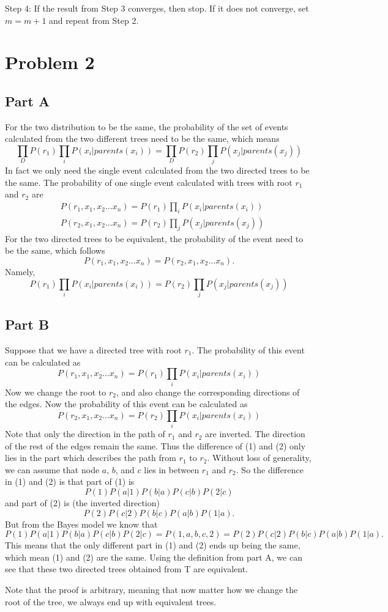 \noindent Step 4: If the result from Step 3 converges, then stop. If it does not converge, set $m=m+1$ and repeat from Step 2.


\section{Problem 2}
\subsection{Part A}
For the two distribution to be the same, the probability of the set of events calculated from the two different trees need to be the same, which means
\[\prod\limits_{D}P(r_1)\prod\limits_{i}P(x_i|parents(x_i))=\prod\limits_{D}P(r_2)\prod\limits_{j}P(x_j|parents(x_j))\]
In fact we only need the single event calculated from the two directed trees to be the same. The probability of one single event calculated with trees with root $r_1$ and $r_2$ are
\begin{align*}
& P(r_1,x_1,x_2\ldots x_n)=P(r_1)\prod\limits_{i}P(x_i|parents(x_i)) \\
& P(r_2,x_1,x_2\ldots x_n)=P(r_2)\prod\limits_{j}P(x_j|parents(x_j))
\end{align*}
For the two directed trees to be equivalent, the probability of the event need to be the same, which follows 
\[P(r_1,x_1,x_2\ldots x_n)=P(r_2,x_1,x_2\ldots x_n).\]
Namely,
\[P(r_1)\prod\limits_{i}P(x_i|parents(x_i))=P(r_2)\prod\limits_{j}P(x_j|parents(x_j))\]

\subsection{Part B}
Suppose that we have a directed tree with root $r_1$. The probability of this event can be calculated as
\begin{equation}
P(r_1,x_1,x_2\ldots x_n)=P(r_1)\prod\limits_{i}P(x_i|parents(x_i))
\end{equation}
Now we change the root to $r_2$, and also change the corresponding directions of the edges. Now the probability of this event can be calculated as 
\begin{equation}
P(r_2,x_1,x_2\ldots x_n)=P(r_2)\prod\limits_{i}P(x_i|parents(x_i))
\end{equation}
Note that only the direction in the path of $r_1$ and $r_2$ are inverted. The direction of the rest of the edges remain the same. Thus the difference of (1) and (2) only lies in the part which describes the path from $r_1$ to $r_2$. Without loss of generality, we can assume that node $a$, $b$, and $c$ lies in between $r_1$ and $r_2$. So the difference in (1) and (2) is that part of (1) is 
\[P(1)P(a|1)P(b|a)P(c|b)P(2|c)\] 
and part of (2) is (the inverted direction)
\[P(2)P(c|2)P(b|c)P(a|b)P(1|a).\] 
But from the Bayes model we know that 
\[P(1)P(a|1)P(b|a)P(c|b)P(2|c)=P(1,a,b,c,2)=P(2)P(c|2)P(b|c)P(a|b)P(1|a).\]
This means that the only different part in (1) and (2) ends up being the same, which mean (1) and (2) are the same. Using the definition from part A, we can see that these two directed trees obtained from T are equivalent. 

\noindent Note that the proof is arbitrary, meaning that now matter how we change the root of the tree, we always end up with equivalent trees. 



